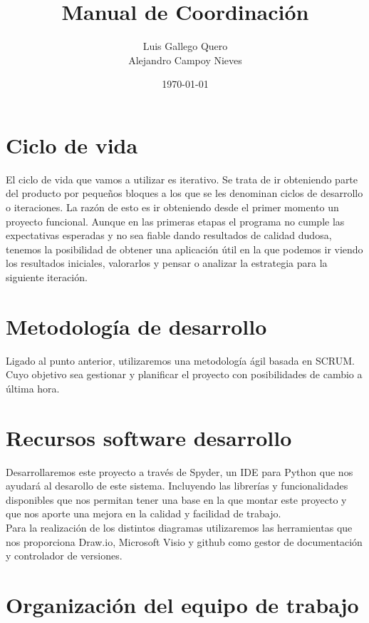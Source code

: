 \documentclass[a4paper,12pt,oneside]{article}
\title{Manual de Coordinación}
\author{Luis Gallego Quero \\ Alejandro Campoy Nieves}
\date{\today}
\begin{document}
\maketitle			
 
\section{Ciclo de vida}

El ciclo de vida que vamos a utilizar es iterativo. Se trata de ir obteniendo parte del producto por pequeños bloques a los que se les denominan ciclos de desarrollo o iteraciones. La razón de esto es ir obteniendo desde el primer momento un proyecto funcional. Aunque en las primeras etapas el programa no cumple las expectativas esperadas y no sea fiable dando resultados de calidad dudosa, tenemos la posibilidad de obtener una aplicación útil en la que podemos ir viendo los resultados iniciales, valorarlos y pensar o analizar la estrategia para la siguiente iteración.

\section{Metodología de desarrollo}

Ligado al punto anterior, utilizaremos una metodología ágil basada en SCRUM. Cuyo objetivo sea gestionar y planificar el proyecto con posibilidades de cambio a última hora. 

\section{Recursos software desarrollo}

Desarrollaremos este proyecto a través de Spyder, un IDE para Python que nos ayudará al desarollo de este sistema. Incluyendo las librerías y funcionalidades disponibles que nos permitan tener una base en la que montar este proyecto y que nos aporte una mejora en la calidad y facilidad de trabajo. \\

Para la realización de los distintos diagramas utilizaremos las herramientas que nos proporciona Draw.io, Microsoft Visio y github como gestor de documentación y controlador de versiones.

\section{Organización del equipo de trabajo}
\end{document}
